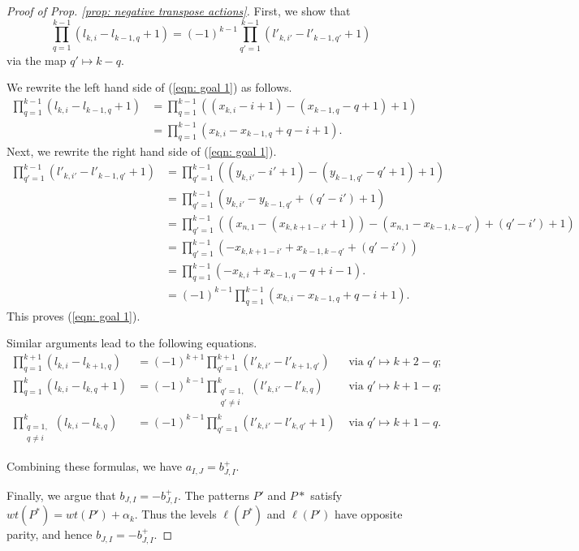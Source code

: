 \documentclass{amsart}[12pt]
\theoremstyle{definition}
\numberwithin{equation}{section}
\begin{document}
\begin{proof}[Proof of Prop. \ref{prop: negative transpose actions}]
First, we show that
\begin{equation} \label{eqn: goal 1}
\prod_{q=1}^{k-1}(l_{k,i}-l_{k-1,q}+1) = (-1)^{k-1}\prod_{q'=1}^{k-1}(l'_{k,i'}-l'_{k-1,q'}+1)
\end{equation}
via the map $q' \mapsto k-q$.

We rewrite the left hand side of (\ref{eqn: goal 1}) as follows.
\begin{align*}
\prod_{q=1}^{k-1}(l_{k,i}-l_{k-1,q}+1) &= \prod_{q=1}^{k-1}((x_{k,i}-i+1)-(x_{k-1,q}-q+1)+1)\\ 
&= \prod_{q=1}^{k-1}(x_{k,i}-x_{k-1,q}+q-i+1). 
\end{align*}
Next, we rewrite the right hand side of (\ref{eqn: goal 1}).
\begin{align*}
\prod_{q'=1}^{k-1}(l'_{k,i'}-l'_{k-1,q'}+1) &= \prod_{q'=1}^{k-1}((y_{k,i'}-i'+1)-(y_{k-1,q'}-q'+1)+1) \\
&= \prod_{q'=1}^{k-1}(y_{k,i'}-y_{k-1,q'}+(q'-i')+1) \\
&= \prod_{q'=1}^{k-1}((x_{n,1}-(x_{k,k+1-i'}+1))-(x_{n,1} - x_{k-1,k-q'})+(q'-i')+1) \\
&= \prod_{q'=1}^{k-1}(-x_{k,k+1-i'}+x_{k-1,k-q'}+(q'-i')) \\
&= \prod_{q=1}^{k-1}(-x_{k,i}+x_{k-1,q}-q+i-1). \\
&= (-1)^{k-1}\prod_{q=1}^{k-1}(x_{k,i}-x_{k-1,q}+q-i+1).    
\end{align*}
This proves (\ref{eqn: goal 1}).

Similar arguments lead to the following equations.
\begin{align*}
  \prod_{q=1}^{k+1} (l_{k,i}-l_{k+1,q}) &= (-1)^{k+1} \prod_{q'=1}^{k+1}(l'_{k,i'}-l'_{k+1,q'}) &\text{ via } q' \mapsto k+2-q;\\
  \prod_{q=1}^{k}(l_{k,i}-l_{k,q}+1) &=  (-1)^{k-1}\prod_{\substack{q'=1,\\q'\neq i}}^{k} (l'_{k,i'}-l'_{k,q}) &\text{ via } q' \mapsto k+1-q;\\
  \prod_{\substack{q=1,\\q\neq i}}^{k} (l_{k,i}-l_{k,q}) &=  (-1)^{k-1}\prod_{q'=1}^{k}(l'_{k,i'}-l'_{k,q'}+1) &\text{ via } q' \mapsto k+1-q.
\end{align*} 

Combining these formulas, we have $a_{I,J} = b_{J,I}^{+}$.

Finally, we argue that $b_{J,I} = -b_{J,I}^{+}.$ The patterns $P'$ and $P*$ satisfy $wt(P^{*}) = wt(P') + \alpha_k$. Thus the levels $\ell(P^{*})$ and $\ell(P')$ have opposite parity, and hence  $b_{J,I} = -b_{J,I}^{+}.$
\end{proof}
\end{document}
